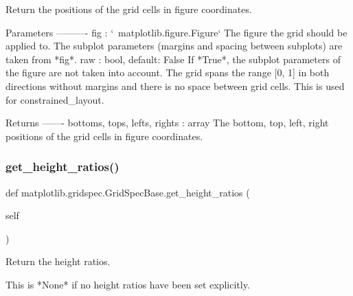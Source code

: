 \begin{DoxyVerb}Return the positions of the grid cells in figure coordinates.

Parameters
----------
fig : `~matplotlib.figure.Figure`
    The figure the grid should be applied to. The subplot parameters
    (margins and spacing between subplots) are taken from *fig*.
raw : bool, default: False
    If *True*, the subplot parameters of the figure are not taken
    into account. The grid spans the range [0, 1] in both directions
    without margins and there is no space between grid cells. This is
    used for constrained_layout.

Returns
-------
bottoms, tops, lefts, rights : array
    The bottom, top, left, right positions of the grid cells in
    figure coordinates.
\end{DoxyVerb}
 \mbox{\label{classmatplotlib_1_1gridspec_1_1GridSpecBase_a536a3b2325dd513f8d45d772fb4182c2}} 
\subsubsection{\texorpdfstring{get\+\_\+height\+\_\+ratios()}{get\_height\_ratios()}}
{\footnotesize\ttfamily def matplotlib.\+gridspec.\+Grid\+Spec\+Base.\+get\+\_\+height\+\_\+ratios (\begin{DoxyParamCaption}\item[{}]{self }\end{DoxyParamCaption})}

\begin{DoxyVerb}Return the height ratios.

This is *None* if no height ratios have been set explicitly.
\end{DoxyVerb}
 \mbox{\label{classmatplotlib_1_1gridspec_1_1GridSpecBase_a4eac56d7bc403f516ad3159d81949f44}} 
